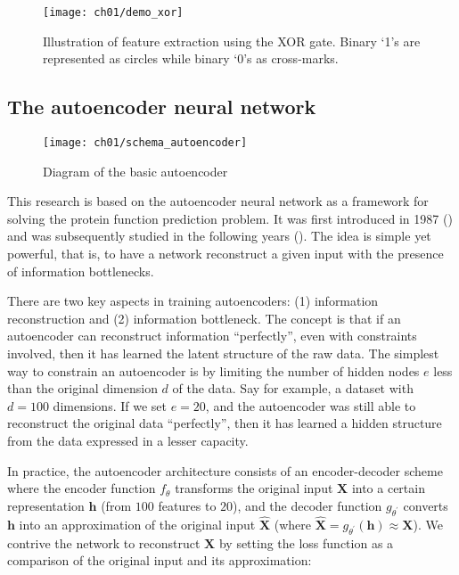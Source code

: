\begin{figure}[!t]
  \centering
  \texttt{[image: ch01/demo\_xor]}
  \caption[Illustration of feature extraction using the XOR gate]
    {Illustration of feature extraction using the XOR gate. Binary `1's are represented as
    circles while binary `0's as cross-marks.}
  \label{demo:xor}
\end{figure}

\subsection{The autoencoder neural network}

\begin{wrapfigure}{r}{0.5\textwidth}
  \centering
  \texttt{[image: ch01/schema\_autoencoder]}
  \caption[Diagram of the basic autoencoder]{
      Diagram of the basic autoencoder
  }
  \label{schema:autoencoder}
\end{wrapfigure}

\par This research is based on the autoencoder neural network as a framework
for solving the protein function prediction problem. It was first introduced
in 1987 (\cite{lecun1987phd}) and was subsequently studied in the following
years (\cite{bourlard1988auto, hinton1994autoencoders}). The idea is simple
yet powerful, that is, to have a network reconstruct a given input with the
presence of information bottlenecks.

\par There are two key aspects in training autoencoders: (1) information
reconstruction and (2) information bottleneck. The concept is that if an
autoencoder can reconstruct information ``perfectly'', even with constraints
involved, then it has learned the latent structure of the raw data. The
simplest way to constrain an autoencoder is by limiting the number of hidden
nodes $e$ less than the original dimension $d$ of the data. Say for example,
a dataset with $d=100$ dimensions. If we set $e=20$, and the autoencoder was
still able to reconstruct the original data ``perfectly'', then it has
learned a hidden structure from the data expressed in a lesser capacity.

\par In practice, the autoencoder architecture consists of an encoder-decoder
scheme where the encoder function $f_{\theta}$ transforms the original input
$\mathbf{X}$ into a certain representation $\mathbf{h}$ (from $100$ features
to $20$), and the decoder function $g_{\theta^{\prime}}$ converts
$\mathbf{h}$ into an approximation of the original input
$\mathbf{\widehat{X}}$ (where $\mathbf{\widehat{X}} =
g_{\theta^{\prime}}(\mathbf{h}) \approx \mathbf{X}$). We contrive the network
to reconstruct $\mathbf{X}$ by setting the loss function as a comparison of
the original input and its approximation:

